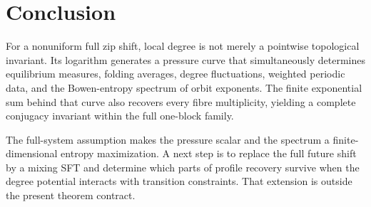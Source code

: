 \section{Conclusion}

For a nonuniform full zip shift, local degree is not merely a pointwise
topological invariant.  Its logarithm generates a pressure curve that
simultaneously determines equilibrium measures, folding averages, degree
fluctuations, weighted periodic data, and the Bowen-entropy spectrum of orbit
exponents.  The finite exponential sum behind that curve also recovers every
fibre multiplicity, yielding a complete conjugacy invariant within the full
one-block family.

The full-system assumption makes the pressure scalar and the spectrum a
finite-dimensional entropy maximization.  A next step is to replace the full
future shift by a mixing SFT and determine which parts of profile recovery
survive when the degree potential interacts with transition constraints.
That extension is outside the present theorem contract.
